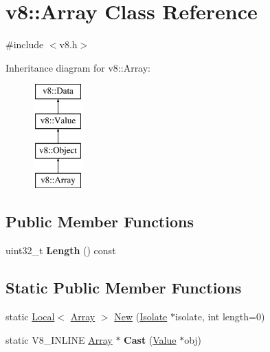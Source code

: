 \hypertarget{classv8_1_1Array}{}\section{v8\+:\+:Array Class Reference}
\label{classv8_1_1Array}


{\ttfamily \#include $<$v8.\+h$>$}

Inheritance diagram for v8\+:\+:Array\+:\begin{figure}[H]
\begin{center}
\leavevmode
\includegraphics[height=4.000000cm]{classv8_1_1Array}
\end{center}
\end{figure}
\subsection*{Public Member Functions}
\begin{DoxyCompactItemize}
\item 
\mbox{\label{classv8_1_1Array_ad6b33c7dd543044ca2311c000a1642dd}} 
uint32\+\_\+t {\bfseries Length} () const
\end{DoxyCompactItemize}
\subsection*{Static Public Member Functions}
\begin{DoxyCompactItemize}
\item 
static \mbox{\hyperlink{classv8_1_1Local}{Local}}$<$ \mbox{\hyperlink{classv8_1_1Array}{Array}} $>$ \mbox{\hyperlink{classv8_1_1Array_a892f18fe6a25dfc0bc7b435759a30226}{New}} (\mbox{\hyperlink{classv8_1_1Isolate}{Isolate}} $\ast$isolate, int length=0)
\item 
\mbox{\label{classv8_1_1Array_ae56792766f8513395c3ebe8c29afde4b}} 
static V8\+\_\+\+I\+N\+L\+I\+NE \mbox{\hyperlink{classv8_1_1Array}{Array}} $\ast$ {\bfseries Cast} (\mbox{\hyperlink{classv8_1_1Value}{Value}} $\ast$obj)
\end{DoxyCompactItemize}


